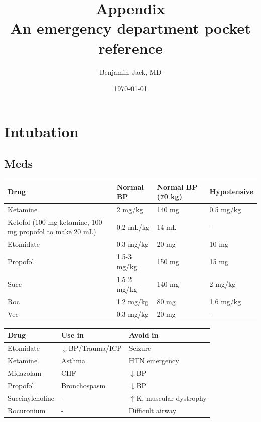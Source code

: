 \documentclass[8pt]{extarticle}
\title{Appendix \\
    \large An emergency department pocket reference}
\author{Benjamin Jack, MD}
\date{\today}
\begin{document}
\maketitle
\newpage

\tableofcontents
\newpage

\section{Intubation}
\subsection{Meds}

\begin{tabularx}{\linewidth}{|X|X|X|X|}
\hline
\textbf{Drug} & \textbf{Normal BP} & \textbf{Normal BP (70 kg)} & \textbf{Hypotensive} \\
\hline

Ketamine & 2 mg/kg & 140 mg & 0.5 mg/kg  \\
\hline
Ketofol (100 mg ketamine, 100 mg propofol to make 20 mL) & 0.2 mL/kg & 14 mL & - \\
\hline
Etomidate & 0.3 mg/kg & 20 mg & 10 mg \\
\hline
Propofol & 1.5-3 mg/kg & 150 mg & 15 mg \\
\hline
Succ & 1.5-2 mg/kg & 140 mg & 2 mg/kg \\
\hline
Roc & 1.2 mg/kg & 80 mg & 1.6 mg/kg \\
\hline
Vec & 0.3 mg/kg & 20 mg & - \\
\hline
\end{tabularx}

\vfill

\begin{tabularx}{\linewidth}{|X|X|X|}
\hline
\textbf{Drug} & \textbf{Use in} & \textbf{Avoid in} \\
\hline

Etomidate & $\downarrow$BP/Trauma/ICP & Seizure  \\
\hline
Ketamine & Asthma & HTN emergency  \\
\hline
Midazolam & CHF & $\downarrow$BP  \\
\hline
Propofol & Bronchospasm & $\downarrow$BP  \\
\hline
Succinylcholine & - & $\uparrow$K, muscular dystrophy \\
\hline
Rocuronium & - & Difficult airway \\
\hline
\end{tabularx}
\end{document}
